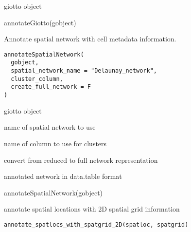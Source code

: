 \documentclass[a4paper]{book}
\begin{document}
%
\begin{Value}
giotto object
\end{Value}
%
\begin{Examples}
\begin{ExampleCode}
    annotateGiotto(gobject)
\end{ExampleCode}
\end{Examples}
%
\begin{Description}\relax
Annotate spatial network with cell metadata information.
\end{Description}
%
\begin{Usage}
\begin{verbatim}
annotateSpatialNetwork(
  gobject,
  spatial_network_name = "Delaunay_network",
  cluster_column,
  create_full_network = F
)
\end{verbatim}
\end{Usage}
%
\begin{Arguments}
\begin{ldescription}
\item[\code{gobject}] giotto object

\item[\code{spatial\_network\_name}] name of spatial network to use

\item[\code{cluster\_column}] name of column to use for clusters

\item[\code{create\_full\_network}] convert from reduced to full network representation
\end{ldescription}
\end{Arguments}
%
\begin{Value}
annotated network in data.table format
\end{Value}
%
\begin{Examples}
\begin{ExampleCode}
    annotateSpatialNetwork(gobject)
\end{ExampleCode}
\end{Examples}
%
\begin{Description}\relax
annotate spatial locations with 2D spatial grid information
\end{Description}
%
\begin{Usage}
\begin{verbatim}
annotate_spatlocs_with_spatgrid_2D(spatloc, spatgrid)
\end{verbatim}
\end{Usage}
\end{document}
